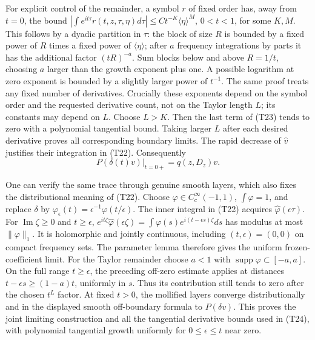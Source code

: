 \documentclass[
  11pt,
]{article}
\begin{document}
For explicit control of the remainder, a symbol \(r\) of fixed order
has, away from \(t=0\), the bound
\(\left|\int e^{it\tau}r(t,z,\tau,\eta)d\tau\right|
\leq Ct^{-K}\langle\eta\rangle^M\), \(0<t<1\), for some \(K,M\). This
follows by a dyadic partition in \(\tau\): the block of size \(R\) is
bounded by a fixed power of \(R\) times a fixed power of
\(\langle\eta\rangle\); after \(a\) frequency integrations by parts it
has the additional factor \((tR)^{-a}\). Sum blocks below and above
\(R=1/t\), choosing \(a\) larger than the growth exponent plus one. A
possible logarithm at zero exponent is bounded by a slightly larger
power of \(t^{-1}\). The same proof treats any fixed number of
derivatives. Crucially these exponents depend on the symbol order and
the requested derivative count, not on the Taylor length \(L\); its
constants may depend on \(L\). Choose \(L>K\). Then the last term of
(T23) tends to zero with a polynomial tangential bound. Taking larger
\(L\) after each desired derivative proves all corresponding boundary
limits. The rapid decrease of \(\widehat v\) justifies their integration
in (T22). Consequently \[
\left.P(\delta(t)v)\right|_{t=0+}=q(z,D_z)v.
\tag{T24}
\]

One can verify the same trace through genuine smooth layers, which also
fixes the distributional meaning of (T22). Choose
\(\varphi\in C_c^\infty(-1,1)\), \(\int\varphi=1\), and replace
\(\delta\) by \(\varphi_\epsilon(t)=\epsilon^{-1}\varphi(t/\epsilon)\).
The inner integral in (T22) acquires \(\widehat\varphi(\epsilon\tau)\).
For \(\operatorname{Im}\zeta\geq0\) and \(t\geq\epsilon\),
\(e^{it\zeta}\widehat\varphi(\epsilon\zeta)=\int\varphi(s)e^{i(t-\epsilon s)\zeta}ds\)
has modulus at most \(\|\varphi\|_1\). It is holomorphic and jointly
continuous, including \((t,\epsilon)=(0,0)\) on compact frequency sets.
The parameter lemma therefore gives the uniform frozen-coefficient
limit. For the Taylor remainder choose \(a<1\) with
\(\operatorname{supp}\varphi\subset[-a,a]\). On the full range
\(t\geq\epsilon\), the preceding off-zero estimate applies at distances
\(t-\epsilon s\geq(1-a)t\), uniformly in \(s\). Thus its contribution
still tends to zero after the chosen \(t^L\) factor. At fixed \(t>0\),
the mollified layers converge distributionally and in the displayed
smooth off-boundary formula to \(P(\delta v)\). This proves the joint
limiting construction and all the tangential derivative bounds used in
(T24), with polynomial tangential growth uniformly for
\(0\leq\epsilon\leq t\) near zero.
\end{document}
